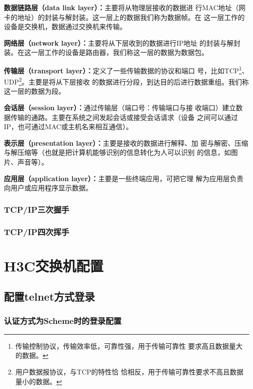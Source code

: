 {\bfseries{数据链路层（data link layer）：}}主要将从物理层接收的数据进
行MAC地址（网卡的地址）的封装与解封装。这一层上的数据我们称为数据帧。在
这一层工作的设备是交换机，数据通过交换机来传输。

{\bfseries{网络层（network layer）：}}主要将从下层收到的数据进行IP地址
的封装与解封装。在这一层工作的设备是路由器，我们称这一层的数据为数据包。

{\bfseries{传输层（transport layer）：}}定义了一些传输数据的协议和端口
号，比如TCP\footnote{传输控制协议，传输效率低，可靠性强，用于传输可靠性
  要求高且数据量大的数据。}、UDP\footnote{用户数据报协议，与TCP的特性恰
  恰相反，用于传输可靠性要求不高且数据量小的数据。}。主要是将从下层接收
的数据进行分段，到达目的后进行数据重组。我们称这一层的数据为段。

{\bfseries{会话层（session layer）：}}通过传输层（端口号：传输端口与接
收端口）建立数据传输的通路。主要在系统之间发起会话或接受会话请求（设备
之间可以通过IP，也可通过MAC或主机名来相互通信）。

{\bfseries{表示层（presentation layer）：}}主要是接收的数据进行解释、加
密与解密、压缩与解压缩等（也就是把计算机能够识别的信息转化为人可以识别
的信息，如图片、声音等）。

{\bfseries{应用层（application layer）：}}主要是一些终端应用，可把它理
解为应用层负责向用户或应用程序显示数据。

\subsection{TCP/IP三次握手}
\label{subsec:tcpIpThreeHandShake}

\subsection{TCP/IP四次挥手}
\label{subsec:tcpIpFourHandShake}

\chapter{H3C交换机配置}

\section{配置telnet方式登录}

\subsection{认证方式为Scheme时的登录配置}

